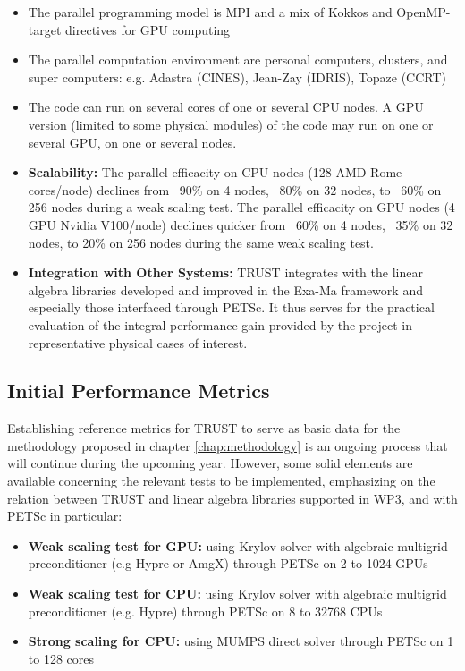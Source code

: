 \begin{itemize}
    \item The parallel programming model is MPI and a mix of Kokkos and OpenMP-target directives for GPU computing  
    \item The parallel computation environment are personal computers, clusters, and super computers: e.g. Adastra (CINES), Jean-Zay (IDRIS), Topaze (CCRT)
    \item The code can run on several cores of one or several CPU nodes. A GPU version (limited to some physical modules) of the code may run on one or several GPU, on one or several nodes.
    \item \textbf{Scalability:} The parallel efficacity on CPU nodes (128 AMD Rome cores/node) declines from ~90\% on 4 nodes, ~80\% on 32 nodes, to ~60\% on 256 nodes during a weak scaling test. The parallel efficacity on GPU nodes (4 GPU Nvidia V100/node) declines quicker from ~60\% on 4 nodes, ~35\% on 32 nodes, to 20\% on 256 nodes during the same weak scaling test.
    \item \textbf{Integration with Other Systems:} TRUST integrates with the linear algebra libraries developed and improved in the Exa-Ma framework and especially those interfaced through PETSc. It thus serves for the practical evaluation of the integral performance gain provided by the project in representative physical cases of interest.
\end{itemize}


\subsection{Initial Performance Metrics}
\label{sec:WP3:TRUST Platform:metrics}

Establishing reference metrics for TRUST to serve as basic data for the methodology proposed in chapter \ref{chap:methodology} is an ongoing process that will continue during the upcoming year. However, some solid elements are available concerning the relevant tests to be implemented, emphasizing on the relation between TRUST and linear algebra libraries supported in WP3, and with PETSc in particular:

\begin{itemize}
    \item \textbf{Weak scaling test for GPU: } using Krylov solver with algebraic multigrid preconditioner (e.g Hypre or AmgX) through PETSc on 2 to 1024 GPUs
    \item\textbf{Weak scaling test for CPU: } using Krylov solver with algebraic multigrid preconditioner (e.g. Hypre) through PETSc on 8 to 32768 CPUs
    \item \textbf{Strong scaling for CPU: } using MUMPS direct solver through PETSc on 1 to 128 cores
\end{itemize}

